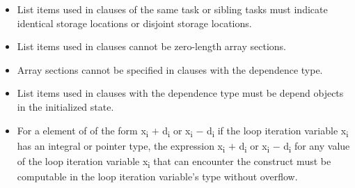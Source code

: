 \begin{itemize}
\item List items used in  clauses of the same task or sibling tasks must indicate
identical storage locations or disjoint storage locations.

\item List items used in  clauses cannot be zero-length array sections.
\item Array sections cannot be specified in  clauses with the  dependence type.
\item List items used in  clauses with the  dependence type must be depend objects in the initialized state.



\item For a  element of   of the form
x\textsubscript{i} $+$ d\textsubscript{i} or x\textsubscript{i} $-$ d\textsubscript{i} if the loop iteration variable
x\textsubscript{i} has an integral or pointer type, the expression x\textsubscript{i} $+$ d\textsubscript{i} or
x\textsubscript{i} $-$ d\textsubscript{i} for any value of the loop iteration variable x\textsubscript{i} that
can encounter the  construct must be computable in the
loop iteration variable's type without overflow.


\end{itemize}
